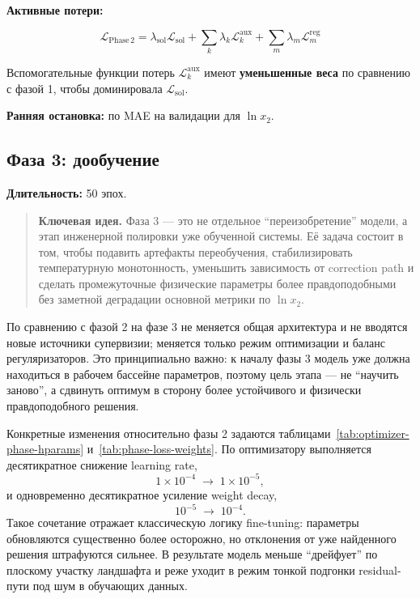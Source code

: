 \documentclass[11pt]{article}
\newcommand{\keyidea}[1]{\begin{quote}\textbf{Ключевая идея.} #1\end{quote}}
\begin{document}
\textbf{Активные потери:}

\begin{equation*}
\mathcal{L}_{\mathrm{Phase\,2}} = \lambda_{\mathrm{sol}}\mathcal{L}_{\mathrm{sol}} + \sum_{k} \lambda_k \mathcal{L}_k^{\mathrm{aux}} + \sum_{m} \lambda_m \mathcal{L}_m^{\mathrm{reg}}
\end{equation*}

Вспомогательные функции потерь $\mathcal{L}_k^{\mathrm{aux}}$ имеют \textbf{уменьшенные веса} по сравнению с фазой 1, чтобы доминировала $\mathcal{L}_{\mathrm{sol}}$.

\textbf{Ранняя остановка:} по MAE на валидации для $\ln x_2$.

\subsection{Фаза 3: дообучение}

\textbf{Длительность:} 50 эпох.

\keyidea{Фаза 3 --- это не отдельное ``переизобретение'' модели, а этап инженерной полировки уже обученной системы. Её задача состоит в том, чтобы подавить артефакты переобучения, стабилизировать температурную монотонность, уменьшить зависимость от correction path и сделать промежуточные физические параметры более правдоподобными без заметной деградации основной метрики по $\ln x_2$.}

По сравнению с фазой 2 на фазе 3 не меняется общая архитектура и не вводятся новые источники супервизии; меняется только режим оптимизации и баланс регуляризаторов. Это принципиально важно: к началу фазы 3 модель уже должна находиться в рабочем бассейне параметров, поэтому цель этапа --- не ``научить заново'', а сдвинуть оптимум в сторону более устойчивого и физически правдоподобного решения.

Конкретные изменения относительно фазы 2 задаются таблицами~\ref{tab:optimizer-phase-hparams} и~\ref{tab:phase-loss-weights}. По оптимизатору выполняется десятикратное снижение learning rate,
\begin{equation*}
1 \times 10^{-4} \;\to\; 1 \times 10^{-5},
\end{equation*}
и одновременно десятикратное усиление weight decay,
\begin{equation*}
10^{-5} \;\to\; 10^{-4}.
\end{equation*}
Такое сочетание отражает классическую логику fine-tuning: параметры обновляются существенно более осторожно, но отклонения от уже найденного решения штрафуются сильнее. В результате модель меньше ``дрейфует'' по плоскому участку ландшафта и реже уходит в режим тонкой подгонки residual-пути под шум в обучающих данных.
\end{document}
